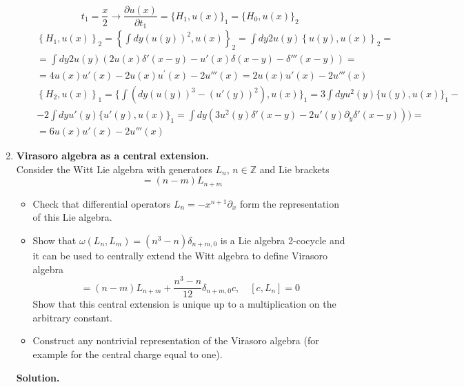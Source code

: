 \documentclass[12pt]{article}
\theoremstyle{definition}
\begin{document}
\begin{enumerate}
\begin{itemize}
\begin{multline}
        \end{multline}
        \begin{equation}
            t_1=\frac{x}{2}\rightarrow\frac{\partial u(x)}{\partial t_1}=\{H_1,u(x)\}_1=\{H_0,u(x)\}_2
        \end{equation}
        \begin{multline}
            \left\{H_1, u(x)\right\}_2=\left\{\int dy(u(y))^2,u(x) \right\}_2=\int dy2u(y)\left\{u(y),u(x)\right\}_2=\\=\int dy2u(y)(2u(x)\delta'(x-y)-u'(x)\delta(x-y)-\delta'''(x-y))=\\=4u(x)u'(x)-2u(x)u^{\prime}(x)-2 u'''(x)=2u(x)u'(x)-2u'''(x)
        \end{multline}
        \begin{multline}
            \left\{H_2, u(x)\right\}_1=\{\int(dy(u(y))^3-(u'(y))^2),u(x)\}_1=3\int dyu^2(y)\{u(y),u(x)\}_1-\\-2\int dyu'(y)\{u'(y),u(x)\}_1=\int dy (3u^2(y)\delta'(x-y)-2u'(y)\partial_y\delta'(x-y)))=\\=6u(x)u'(x)-2u'''(x)
        \end{multline}
    \end{itemize}
    \item \textbf{Virasoro algebra as a central extension.}\\
    Consider the Witt Lie algebra with generators $L_n$, $n\in\mathbb{Z}$ and Lie brackets
    \begin{equation}
        [L_n,L_m]=(n-m)L_{n+m}
    \end{equation}
    \begin{itemize}
        \item Check that differential operators $L_n=-x^{n+1}\partial_x$ form the representation of this Lie algebra.
        \item Show that $\omega(L_n,L_m)=(n^3-n)\delta_{n+m,0}$ is a Lie algebra 2-cocycle and it can be used to centrally extend the Witt algebra to define Virasoro algebra
        \begin{equation}
            [L_n,L_m]=(n-m)L_{n+m}+\frac{n^3-n}{12}\delta_{n+m,0}c,\quad[c,L_n]=0
        \end{equation}
        Show that this central extension is unique up to a multiplication on the arbitrary constant.
        \item Construct any nontrivial representation of the Virasoro algebra (for example for the central charge equal to one).
    \end{itemize}
    \textbf{Solution.}

\end{enumerate}
\end{document}
